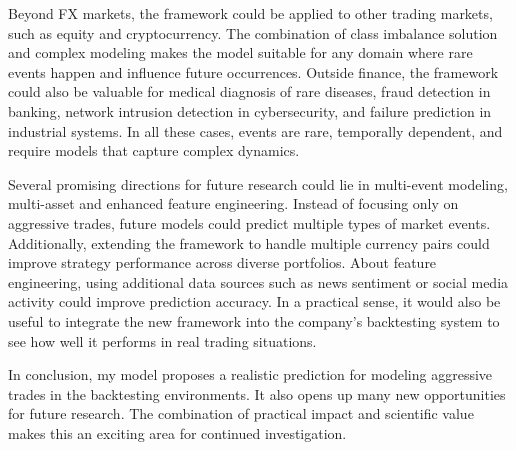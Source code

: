 
Beyond FX markets, the framework could be applied to other trading markets, such as equity and cryptocurrency. The combination of class imbalance solution and complex modeling makes the model suitable for any domain where rare events happen and influence future occurrences. Outside finance, the framework could also be valuable for medical diagnosis of rare diseases, fraud detection in banking, network intrusion detection in cybersecurity, and failure prediction in industrial systems. In all these cases, events are rare, temporally dependent, and require models that capture complex dynamics.

Several promising directions for future research could lie in multi-event modeling, multi-asset and enhanced feature engineering. Instead of focusing only on aggressive trades, future models could predict multiple types of market events. Additionally, extending the framework to handle multiple currency pairs could improve strategy performance across diverse portfolios. About feature engineering, using additional data sources such as news sentiment or social media activity could improve prediction accuracy. In a practical sense, it would also be useful to integrate the new framework into the company's backtesting system to see how well it performs in real trading situations.

In conclusion, my model proposes a realistic prediction for modeling aggressive trades in the backtesting environments. It also opens up many new opportunities for future research. The combination of practical impact and scientific value makes this an exciting area for continued investigation.


